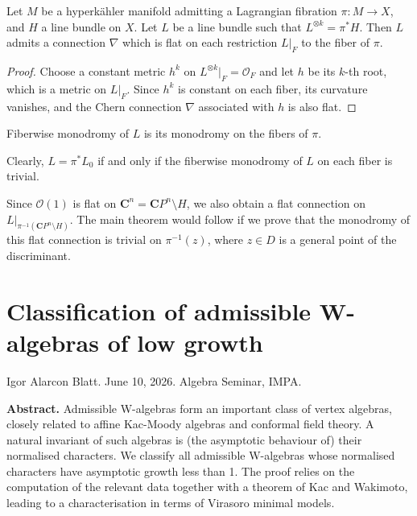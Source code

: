 \begin{proposition}
\label{proposition-fiberwise-monodromy-line-bundle}
Let \(M\) be a hyperk\"ahler manifold
admitting a Lagrangian fibration
\(\pi : M \to X\), and \(H\) a line bundle on
\(X\). Let \(L\) be a line bundle such
that \(L^{\otimes k} = \pi^*H\). Then \(L\)
admits a connection \(\nabla\) which is flat
on each restriction \(L|_F\) to the fiber of
\(\pi\).
\end{proposition}

\begin{proof}
Choose a constant metric \(h^k\) on
\(L^{\otimes k}|_F = \mathcal{O}_F\) and let
\(h\) be its \(k\)-th root, which is a metric
on \(L|_F\). Since \(h^k\) is constant on
each fiber, its curvature vanishes, and the
Chern connection \(\nabla\) associated with
\(h\) is also flat.
\end{proof}

\begin{definition}
\label{definition-fiberwise-monodromy}
Fiberwise monodromy of \(L\) is its
monodromy on the fibers of \(\pi\).
\end{definition}

\begin{remark}
\label{remark-pullback-monodromy}
Clearly, \(L = \pi^*L_0\) if and only if the
fiberwise monodromy of \(L\) on each fiber
is trivial.
\end{remark}

\begin{remark}
\label{remark-flat-connection}
Since \(\mathcal{O}(1)\) is flat on
\(\mathbf{C}^n = \mathbf{C}P^n \setminus H\),
we also obtain a flat connection on
\(L|_{\pi^{-1}(\mathbf{C}P^n\setminus H)}\).
The main theorem would follow if we prove
that the monodromy of this flat connection is
trivial on \(\pi^{-1}(z)\), where
\(z \in D\) is a general point of the
discriminant.
\end{remark}

\section{Classification of admissible
W-algebras of low growth}
\label{section-w-algebras-of-low-growth}

\noindent
Igor Alarcon Blatt. June 10, 2026.
Algebra Seminar, IMPA.

\medskip\noindent
{\bf Abstract.} 
Admissible W-algebras form an important class
of vertex algebras, closely related to affine
Kac-Moody algebras and conformal field
theory. A natural invariant of such algebras
is (the asymptotic behaviour of) their
normalised characters. We classify all
admissible W-algebras whose normalised
characters have asymptotic growth less than
1. The proof relies on the computation of the
relevant data together with a theorem of Kac
and Wakimoto, leading to a characterisation
in terms of Virasoro minimal models.

